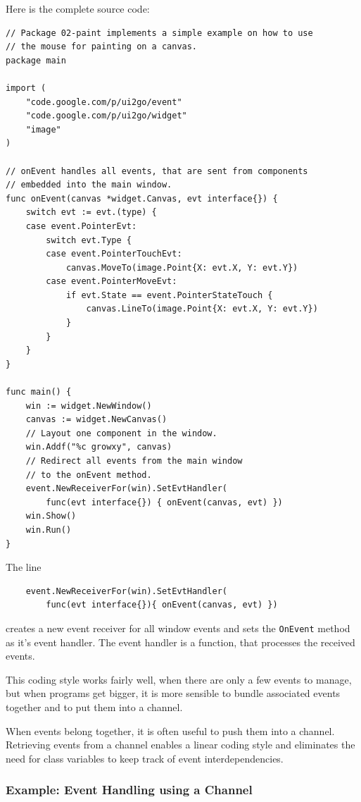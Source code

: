 Here is the complete source code:

\begin{verbatim}
// Package 02-paint implements a simple example on how to use
// the mouse for painting on a canvas.
package main

import (
    "code.google.com/p/ui2go/event"
    "code.google.com/p/ui2go/widget"
    "image"
)

// onEvent handles all events, that are sent from components
// embedded into the main window.
func onEvent(canvas *widget.Canvas, evt interface{}) {
    switch evt := evt.(type) {
    case event.PointerEvt:
        switch evt.Type {
        case event.PointerTouchEvt:
            canvas.MoveTo(image.Point{X: evt.X, Y: evt.Y})
        case event.PointerMoveEvt:
            if evt.State == event.PointerStateTouch {
                canvas.LineTo(image.Point{X: evt.X, Y: evt.Y})
            }
        }
    }
}

func main() {
    win := widget.NewWindow()
    canvas := widget.NewCanvas()
    // Layout one component in the window.
    win.Addf("%c growxy", canvas)
    // Redirect all events from the main window
    // to the onEvent method.
    event.NewReceiverFor(win).SetEvtHandler(
        func(evt interface{}) { onEvent(canvas, evt) })
    win.Show()
    win.Run()
}
\end{verbatim}

The line

\begin{verbatim}
    event.NewReceiverFor(win).SetEvtHandler(
        func(evt interface{}){ onEvent(canvas, evt) })
\end{verbatim}

creates a new event receiver for all window events and sets the
\texttt{OnEvent} method as it's event handler. The event handler is a
function, that processes the received events.

This coding style works fairly well, when there are only a few events to
manage, but when programs get bigger, it is more sensible to bundle
associated events together and to put them into a channel.

When events belong together, it is often useful to push them into a
channel. Retrieving events from a channel enables a linear coding style
and eliminates the need for class variables to keep track of event
interdependencies.


\subsubsection*{Example: Event Handling using a Channel}

